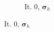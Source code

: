 \documentclass[a4paper,12pt]{amsart}
\numberwithin{equation}{section}
\def\bsigma{{\boldsymbol \sigma}}
\begin{document}
\begin{figure}[h!]
\begin{subfigure}[t]{0.35\textwidth}
	\caption{It. 0, $\bsigma_h$}
\end{subfigure}


\end{figure}
\end{document}
